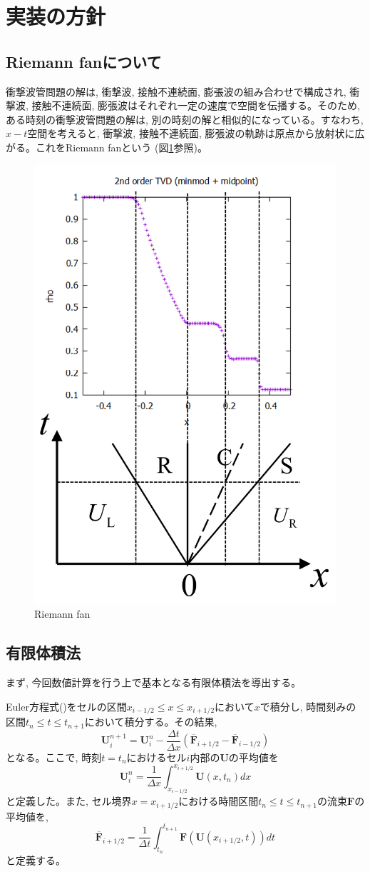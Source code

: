 \documentclass[dvipdfmx,b5paper]{jsarticle}
\begin{document}
\section{実装の方針}
\subsection{Riemann fanについて}
衝撃波管問題の解は, 衝撃波, 接触不連続面, 膨張波の組み合わせで構成され, 衝撃波, 接触不連続面, 膨張波はそれぞれ一定の速度で空間を伝播する。そのため, ある時刻の衝撃波管問題の解は, 別の時刻の解と相似的になっている。すなわち, $x-t$空間を考えると, 衝撃波, 接触不連続面, 膨張波の軌跡は原点から放射状に広がる。これをRiemann fanという (図\ref{fan}参照)。

\begin{figure}[H]
  \centering
  \includegraphics[width = 0.6\linewidth]{fig/riemannfan.png}
  \caption{Riemann fan}
  \label{fan}
\end{figure}

\subsection{有限体積法}
まず, 今回数値計算を行う上で基本となる有限体積法を導出する。

Euler方程式()をセルの区間$x_{i-1/2}\leq x\leq x_{i+1/2}$において$x$で積分し, 時間刻みの区間$t_n\leq t\leq t_{n+1}$において積分する。その結果, 
\begin{equation}
  \bm{U}_{i}^{n+1}=\bm{U}_{i}^{n}-\frac{\Delta t}{\Delta x}\left(\overline{\bm{F}}_{i+1/2}-\overline{\bm{F}}_{i-1/2}\right)
\end{equation}
となる。ここで, 時刻$t=t_n$におけるセル$i$内部の$\bm{U}$の平均値を
\begin{equation}
  \bm{U}_{i}^{n}=\frac{1}{\Delta x}\int_{x_{i-1/2}}^{x_{i+1/2}}\bm{U}(x, t_n)dx
\end{equation}
と定義した。また, セル境界$x=x_{i+1/2}$における時間区間$t_n\leq t\leq t_{n+1}$の流束$\bm{F}$の平均値を, 
\begin{equation}
  \overline{\bm{F}}_{i+1/2}=\frac{1}{\Delta t}\int_{t_{n}}^{t_{n+1}}\bm{F}(\bm{U}(x_{i+1/2}, t))dt
\end{equation}
と定義する。
\end{document}
